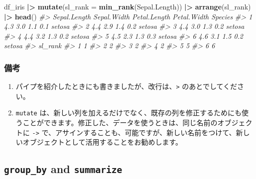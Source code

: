 \documentclass[
  xelatex, ja=standard]{bxjsbook}
\newenvironment{Shaded}{\begin{snugshade}}{\end{snugshade}}
\newcommand{\AttributeTok}[1]{\textcolor[rgb]{0.13,0.29,0.53}{#1}}
\newcommand{\CommentTok}[1]{\textcolor[rgb]{0.56,0.35,0.01}{\textit{#1}}}
\newcommand{\FunctionTok}[1]{\textcolor[rgb]{0.13,0.29,0.53}{\textbf{#1}}}
\newcommand{\NormalTok}[1]{#1}
\newcommand{\SpecialCharTok}[1]{\textcolor[rgb]{0.81,0.36,0.00}{\textbf{#1}}}
\providecommand{\tightlist}{%
  \setlength{\itemsep}{0pt}\setlength{\parskip}{0pt}}
\theoremstyle{definition}
\theoremstyle{definition}
\theoremstyle{definition}
\theoremstyle{definition}
\theoremstyle{remark}
\begin{document}
\begin{Shaded}
\begin{Highlighting}[]
\NormalTok{df\_iris }\SpecialCharTok{|\textgreater{}} \FunctionTok{mutate}\NormalTok{(}\AttributeTok{sl\_rank =} \FunctionTok{min\_rank}\NormalTok{(Sepal.Length)) }\SpecialCharTok{|\textgreater{}} 
  \FunctionTok{arrange}\NormalTok{(sl\_rank) }\SpecialCharTok{|\textgreater{}} \FunctionTok{head}\NormalTok{()}
\CommentTok{\#\textgreater{}   Sepal.Length Sepal.Width Petal.Length Petal.Width Species}
\CommentTok{\#\textgreater{} 1          4.3         3.0          1.1         0.1  setosa}
\CommentTok{\#\textgreater{} 2          4.4         2.9          1.4         0.2  setosa}
\CommentTok{\#\textgreater{} 3          4.4         3.0          1.3         0.2  setosa}
\CommentTok{\#\textgreater{} 4          4.4         3.2          1.3         0.2  setosa}
\CommentTok{\#\textgreater{} 5          4.5         2.3          1.3         0.3  setosa}
\CommentTok{\#\textgreater{} 6          4.6         3.1          1.5         0.2  setosa}
\CommentTok{\#\textgreater{}   sl\_rank}
\CommentTok{\#\textgreater{} 1       1}
\CommentTok{\#\textgreater{} 2       2}
\CommentTok{\#\textgreater{} 3       2}
\CommentTok{\#\textgreater{} 4       2}
\CommentTok{\#\textgreater{} 5       5}
\CommentTok{\#\textgreater{} 6       6}
\end{Highlighting}
\end{Shaded}

\hypertarget{ux5099ux8003-5}{%
\subsubsection{備考}\label{ux5099ux8003-5}}

\begin{enumerate}
\def\labelenumi{\arabic{enumi}.}
\tightlist
\item
  パイプを紹介したときにも書きましたが、改行は、\texttt{\textbar{}\textgreater{}} のあとでしてください。
\item
  \texttt{mutate} は、新しい列を加えるだけでなく、既存の列を修正するためにも使うことができます。修正した、データを使うときは、同じ名前のオブジェクトに \texttt{-\textgreater{}} で、アサインすることも、可能ですが、新しい名前をつけて、新しいオブジェクトとして活用することをお勧めします。
\end{enumerate}

\hypertarget{group_by-and-summarize}{%
\subsection{\texorpdfstring{\texttt{group\_by} and \texttt{summarize}}{group\_by and summarize}}\label{group_by-and-summarize}}
\end{document}
